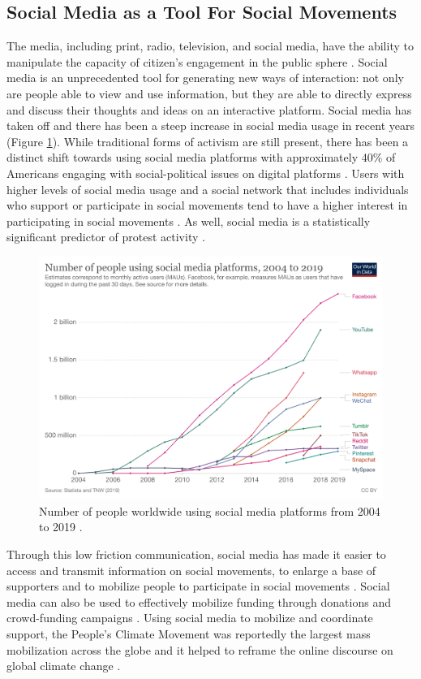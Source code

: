 \documentclass{article}
\begin{document}
\subsection{Social Media as a Tool For Social Movements}
The media, including print, radio, television, and social media, have the ability to manipulate the capacity of citizen’s engagement in the public sphere \cite{lopes2014impact}. Social media is an unprecedented tool for generating new ways of interaction: not only are people able to view and use information, but they are able to directly express and discuss their thoughts and ideas on an interactive platform. Social media has taken off and there has been a steep increase in social media usage in recent years (Figure \ref{Social_Media_Usage}). While traditional forms of activism are still present, there has been a distinct shift towards using social media platforms with approximately 40\% of Americans engaging with social-political issues on digital platforms \cite{rainie2012social}. Users with higher levels of social media usage and a social network that includes individuals who support or participate in social movements tend to have a higher interest in participating in social movements \cite{hwang2015social}. As well, social media is a statistically significant predictor of protest activity \cite{lopes2014impact}. 

\begin{figure}[h]
    \includegraphics[width=.85 \textwidth]{./images/users-by-social-media-platform.png}
    \centering
    \caption{Number of people worldwide using social media platforms from 2004 to 2019 \cite{owidinternet}.}
    \label{Social_Media_Usage}
\end{figure}

Through this low friction communication, social media has made it easier to access and transmit information on social movements, to enlarge a base of supporters and to mobilize people to participate in social movements \cite{hwang2015social, mundt2018scaling}.  Social media can also be used to effectively mobilize funding through donations and crowd-funding campaigns \cite{sommerfeldt2013online, doan2018beyond}. Using social media to mobilize and coordinate support, the People's Climate Movement was reportedly the largest mass mobilization across the globe and it helped to reframe the online discourse on global climate change \cite{thorson2016climate}.
\end{document}
